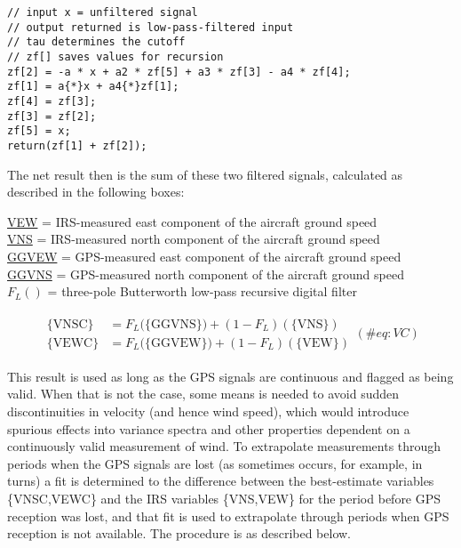 \documentclass[
  english,
]{book}
\begin{document}
\begin{verbatim}
// input x = unfiltered signal  
// output returned is low-pass-filtered input  
// tau determines the cutoff  
// zf[] saves values for recursion  
zf[2] = -a * x + a2 * zf[5] + a3 * zf[3] - a4 * zf[4];  
zf[1] = a{*}x + a4{*}zf[1];     
zf[4] = zf[3];  
zf[3] = zf[2];  
zf[5] = x;  
return(zf[1] + zf[2]); 
\end{verbatim}

The net result then is the sum of these two filtered signals, calculated
as described in the following boxes:

\protect\hyperlink{vew}{VEW} = IRS-measured east component of the
aircraft ground speed\\
\protect\hyperlink{vns}{VNS} = IRS-measured north component of the
aircraft ground speed\\
\protect\hyperlink{ggvew}{GGVEW} = GPS-measured east component of the
aircraft ground speed\\
\protect\hyperlink{ggvns}{GGVNS} = GPS-measured north component of the
aircraft ground speed\\
\(F_{L}()\) = three-pole Butterworth low-pass recursive digital filter

\begin{align}\begin{split}
\{\mathrm{VNSC}\} & = F_{L}(\mathrm{\{GGVNS\})}+(1-F_{L})(\{\mathrm{VNS\}})\\
\{\mathrm{VEWC}\} & = F_{L}(\mathrm{\{GGVEW\})}+(1-F_{L})(\{\mathrm{VEW\}})
\end{split}(\#eq:VC)
\end{align}

This result is used as long as the GPS signals are continuous and
flagged as being valid. When that is not the case, some means is needed
to avoid sudden discontinuities in velocity (and hence wind speed),
which would introduce spurious effects into variance spectra and other
properties dependent on a continuously valid measurement of wind. To
extrapolate measurements through periods when the GPS signals are lost
(as sometimes occurs, for example, in turns) a fit is determined to the
difference between the best-estimate variables \{VNSC,VEWC\} and the IRS
variables \{VNS,VEW\} for the period before GPS reception was lost, and
that fit is used to extrapolate through periods when GPS reception is
not available. The procedure is as described below.
\end{document}
